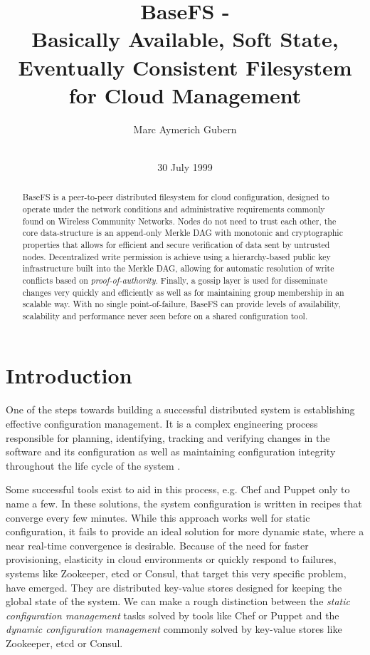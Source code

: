 \documentclass{sig-alternate}
\begin{document}
\title{BaseFS -\\ Basically Available, Soft State, Eventually Consistent Filesystem for Cloud Management}
\author{
\alignauthor
Marc Aymerich Gubern\\
    \\
}
\additionalauthors{}
\date{30 July 1999}

\maketitle

\begin{abstract}
BaseFS is a peer-to-peer distributed filesystem for cloud configuration, designed to operate under the network conditions and administrative requirements commonly found on Wireless Community Networks. Nodes do not need to trust each other, the core data-structure is an append-only Merkle DAG with monotonic and cryptographic properties that allows for efficient and secure verification of data sent by untrusted nodes. Decentralized write permission is achieve using a hierarchy-based public key infrastructure built into the Merkle DAG, allowing for automatic resolution of write conflicts based on \textit{proof-of-authority}. Finally, a gossip layer is used for disseminate changes very quickly and efficiently as well as for maintaining group membership in an scalable way. With no single point-of-failure, BaseFS can provide levels of availability, scalability and performance never seen before on a shared configuration tool.

\end{abstract}
\section{Introduction}
One of the steps towards building a successful distributed system is establishing effective configuration management. It is a complex engineering process responsible for planning, identifying, tracking and verifying changes in the software and its configuration as well as maintaining configuration integrity throughout the life cycle of the system \cite{Yermolaiev:managing}.

Some successful tools exist to aid in this process, e.g. Chef and Puppet only to name a few. In these solutions, the system configuration is written in recipes that converge every few minutes. While this approach works well for static configuration, it fails to provide an ideal solution for more dynamic state, where a near real-time convergence is desirable. Because of the need for faster provisioning, elasticity in cloud environments or quickly respond to failures, systems like Zookeeper, etcd or Consul, that target this very specific problem, have emerged. They are distributed key-value stores designed for keeping the global state of the system. We can make a rough distinction between the \textit{static configuration management} tasks solved by tools like Chef or Puppet and the \textit{dynamic configuration management} commonly solved by key-value stores like Zookeeper, etcd or Consul.
\end{document}

